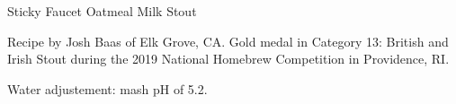\begin{recipe}{Sticky Faucet Oatmeal Milk Stout}

\begin{aboutblock}
Recipe by Josh Baas of Elk Grove, CA. Gold medal in Category 13:
British and Irish Stout during the 2019 National Homebrew Competition
in Providence, RI. \sourceaha
\end{aboutblock}


\begin{methodandtiming}
 
\begin{mashsteps}
\end{mashsteps}

\begin{fermentationsteps}
\end{fermentationsteps}

\begin{directions}
Water adjustement: mash pH of 5.2.
\end{directions}

\end{methodandtiming}

\recipebreak

\begin{ingredientsblock}

\begin{malts}
\end{malts}

\begin{hops}
\end{hops}


\end{ingredientsblock}

\end{recipe}
